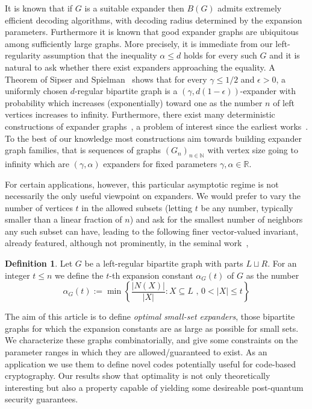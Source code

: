 \documentclass[12pt]{amsart}
\theoremstyle{definition}
\newtheorem{defi}[lemma]{Definition}
\renewcommand{\leq}{\leqslant}
\newcommand{\RR}{\ensuremath{\mathbb{R}}}
\newcommand{\1}{\ensuremath{\mathbb{1}}}
\begin{document}
It is known that if $G$ is a suitable expander then $B(G)$ admits extremely efficient decoding algorithms, with decoding radius determined by the expansion parameters. Furthermore it is known that good expander graphs are ubiquitous among sufficiently large graphs.  More precisely, it is immediate from our left-regularity assumption that the inequality $\alpha\leq d$ holds for every such $G$ and it is natural to ask whether there exist expanders approaching the equality. A Theorem of Sipser and Spielman~\cite{SiSp} shows that for every $\gamma\leq 1/2$ and $\epsilon>0$, a uniformly chosen $d$-regular bipartite graph is a $(\gamma, d(1-\epsilon))$-expander with probability which increases (exponentially) toward one as the number $n$ of left vertices increases to infinity. Furthermore, there exist many deterministic constructions of expander graphs~\cites{ReVaWi, Golowich24}, a problem of interest since the earliest works~\cites{Mar73,Mar88}. To the best of our knowledge most constructions aim towards building expander graph families, that is sequences of graphs $(G_n)_{n\in \mathbb{N}}$ with vertex size going to infinity which are $(\gamma,\alpha)$ expanders for fixed parameters $\gamma,\alpha\in \RR$. 

For certain applications, however, this particular asymptotic regime is not necessarily the only useful viewpoint on expanders. We would prefer to vary the number of vertices $t$ in the allowed subsets (letting $t$ be any number, typically smaller than a linear fraction of $n$) and ask for the smallest number of neighbors any such subset can have, leading to the following finer vector-valued invariant, already featured, although not prominently, in the seminal work~\cite{SiSp},

\begin{defi} Let $G$ be a left-regular bipartite graph with parts $L\sqcup R$. For an integer $t\leq n$  we define the $t$-th expansion constant $\alpha_G(t)$ of $G$ as the number
\[\alpha_G(t):=\min\left\{\frac{|N(X)|}{|X|}: X\subseteq L\text{ , } 0<|X|\leq t\right\}\]
\end{defi}


The aim of this article is to define \emph{optimal small-set expanders}, those bipartite graphs for which the expansion constants are as large as possible for small sets. We characterize these graphs combinatorially, and give some constraints on the parameter ranges in which they are allowed/guaranteed to exist. As an application we use them to define novel codes potentially useful for code-based cryptography. Our results show that optimality is not only theoretically interesting but also a property capable of yielding some desireable post-quantum security guarantees.
\end{document}
